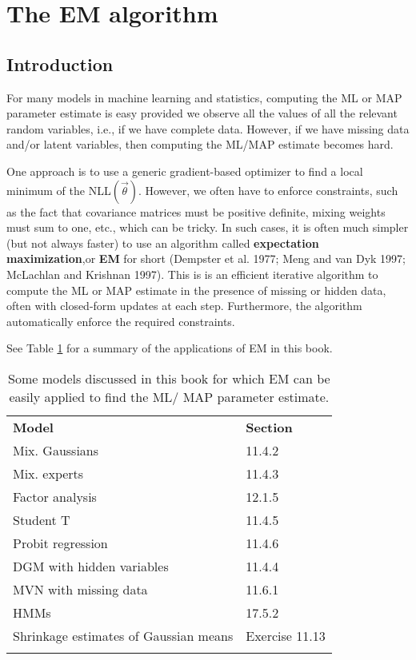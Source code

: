 \section{The EM algorithm}


\subsection{Introduction}
For many models in machine learning and statistics, computing the ML or MAP parameter estimate is easy provided we observe all the values of all the relevant random variables, i.e., if we have complete data. However, if we have missing data and/or latent variables, then computing the ML/MAP estimate becomes hard.

One approach is to use a generic gradient-based optimizer to find a local minimum of the NLL$(\vec{\theta})$. However, we often have to enforce constraints, such as the fact that covariance matrices must be positive definite, mixing weights must sum to one, etc., which can be tricky. In such cases, it is often much simpler (but not always faster) to use an algorithm called \textbf{expectation maximization},or \textbf{EM} for short (Dempster et al. 1977; Meng and van Dyk 1997; McLachlan and Krishnan 1997). This is is an efficient iterative algorithm to compute the ML or MAP estimate in the presence of missing or hidden data, often with closed-form updates at each step. Furthermore, the algorithm automatically enforce the required constraints.

See Table \ref{tab:summary-of-the-applications-of-EM} for a summary of the applications of EM in this book.

\begin{longtable}{ll}
\hline\noalign{\smallskip}
\textbf{Model} & \textbf{Section} \\
\noalign{\smallskip}\hline\noalign{\smallskip}
Mix. Gaussians & 11.4.2 \\
Mix. experts & 11.4.3 \\
Factor analysis & 12.1.5 \\
Student T & 11.4.5 \\
Probit regression & 11.4.6 \\
DGM with hidden variables & 11.4.4 \\
MVN with missing data & 11.6.1 \\
HMMs & 17.5.2 \\
Shrinkage estimates of Gaussian means & Exercise 11.13 \\
\noalign{\smallskip}\hline\noalign{\smallskip}
\caption{Some models discussed in this book for which EM can be easily applied to find the ML/ MAP parameter estimate.}\label{tab:summary-of-the-applications-of-EM} \\
\end{longtable}


